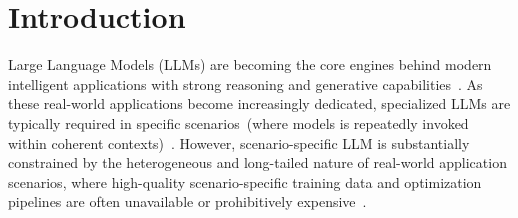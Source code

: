 \section{Introduction}
\vspace{-1mm}

Large Language Models (LLMs) are becoming the core engines behind modern intelligent applications with strong reasoning and generative capabilities~\cite{vaswani2017attention,yao2022react,schick2023toolformer,wang2024survey}. 
As these real-world applications become increasingly dedicated, specialized LLMs are typically required in specific scenarios~(where models is repeatedly invoked within coherent contexts)~\cite{belcak2025slmfuture,belcak2025nvidiaslmblog}.
However, scenario-specific LLM is substantially constrained by the heterogeneous and long-tailed nature of real-world application scenarios, where high-quality scenario-specific training data and optimization pipelines are often unavailable or prohibitively expensive~\cite{kaplan2020scaling}. 

